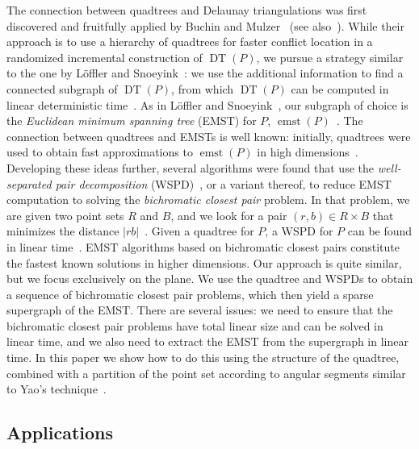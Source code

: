 \documentclass[11pt]{paper}
\DeclareMathOperator {\emst}{emst}
\DeclareMathOperator {\DT}{DT}
\begin{document}
  The connection between quadtrees and Delaunay triangulations was first
  discovered and fruitfully applied by Buchin and
  Mulzer~\cite{BuchinMu11} (see also~\cite{BuchinLoMoMuXX}).
  While their approach is to use a hierarchy of quadtrees
  for faster conflict location in a randomized incremental
  construction of $\DT(P)$,
  we pursue a strategy similar to the one by
  L{\"o}ffler and Snoeyink~\cite{LoefflerSn10}:
  we use the additional information
  to find a connected subgraph of $\DT(P)$,
  from which $\DT(P)$ can be computed in linear deterministic 
  time~\cite{ChinWa99}.
  As in L{\"o}ffler and Snoeyink~\cite{LoefflerSn10},
  our subgraph of choice is the
  \emph{Euclidean minimum spanning tree} (EMST) for $P$,
  $\emst(P)$~\cite{Eppstein00}.
  The connection between quadtrees and EMSTs is well known:
  initially, quadtrees were used to obtain fast approximations
  to $\emst(P)$ in high dimensions~\cite{CallahanKo93,Vaidya88}.
  Developing these ideas further, several algorithms  were found that
  use the \emph{well-separated pair decomposition}
  (WSPD)~\cite{CallahanKo95},
  or a variant thereof, to reduce EMST computation to
  solving the \emph{bichromatic closest pair} problem. In that
  problem, we are given
  two point sets $R$ and $B$, and we look for a
  pair $(r,b) \in R \times B$ that minimizes the distance
  $|rb|$~\cite{AgarwalEdScWe91,CallahanKo93,KrznaricLeNi99,Yao82}.
  Given a quadtree for $P$, a WSPD for $P$ can be found in
  linear time~\cite{BuchinLoMoMuXX,CallahanKo95,Chan08,HarPeled11}. 
  EMST algorithms based
  on bichromatic closest pairs constitute the fastest
  known solutions in higher dimensions. 
  Our approach is quite similar, but we focus exclusively
  on the plane. We use the quadtree and WSPDs to
  obtain a sequence of bichromatic closest pair problems,
  which then yield a sparse supergraph of the EMST. 
  There are several issues:  we need
  to ensure that the bichromatic closest pair problems
  have total linear size and can be solved in linear time,
  and we also need to extract the EMST from the supergraph
  in linear time.
  In this paper we show how to do this using
  the structure of the quadtree, combined with a partition of the
  point set according to angular segments similar to 
  Yao's technique~\cite{Yao82}.

  \subsection {Applications}
\end{document}
